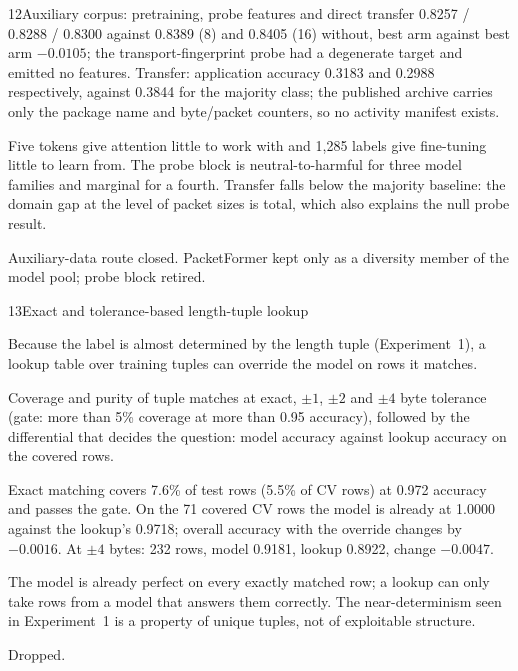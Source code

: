 \begin{explog}{12}{Auxiliary corpus: pretraining, probe features and direct transfer}
0.8257 / 0.8288 / 0.8300 against 0.8389 (8) and 0.8405 (16) without, best arm
against best arm $-0.0105$; the transport-fingerprint probe had a degenerate target
and emitted no features. Transfer: application accuracy 0.3183 and 0.2988
respectively, against 0.3844 for the majority class; the published archive carries
only the package name and byte/packet counters, so no activity manifest exists.
\item[Inference] Five tokens give attention little to work with and 1{,}285 labels give
fine-tuning little to learn from. The probe block is neutral-to-harmful for three
model families and marginal for a fourth. Transfer falls below the majority
baseline: the domain gap at the level of packet sizes is total, which also explains
the null probe result.
\item[Verdict] Auxiliary-data route closed. PacketFormer kept only as a diversity member
of the model pool; probe block retired.
\end{explog}

\begin{explog}{13}{Exact and tolerance-based length-tuple lookup}
\item[Hypothesis] Because the label is almost determined by the length tuple (Experiment~1), a
lookup table over training tuples can override the model on rows it matches.
\item[Method] Coverage and purity of tuple matches at exact, $\pm1$, $\pm2$ and $\pm4$
byte tolerance (gate: more than 5\% coverage at more than 0.95 accuracy), followed
by the differential that decides the question: model accuracy against lookup
accuracy on the covered rows.
\item[Result] Exact matching covers 7.6\% of test rows (5.5\% of CV rows) at 0.972 accuracy
and passes the gate. On the 71 covered CV rows the model is already at 1.0000
against the lookup's 0.9718; overall accuracy with the override changes by
$-0.0016$. At $\pm4$ bytes: 232 rows, model 0.9181, lookup 0.8922, change
$-0.0047$.
\item[Inference] The model is already perfect on every exactly matched row; a lookup can only
take rows from a model that answers them correctly. The near-determinism seen in
Experiment~1 is a property of unique tuples, not of exploitable structure.
\item[Verdict] Dropped.
\end{explog}

